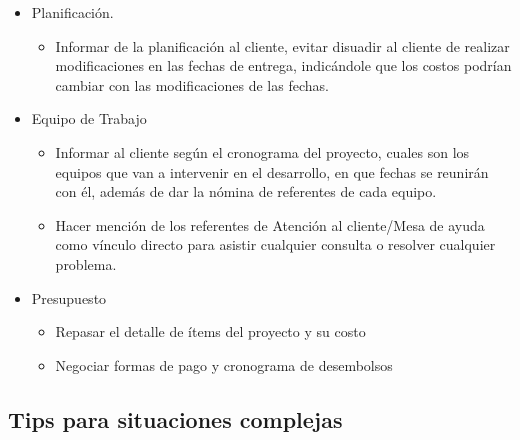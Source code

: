 \begin{itemize}
\begin{itemize}
		\item Planificación.
        
		\begin{itemize}
			\item Informar de la planificación al cliente, evitar disuadir al cliente de realizar modificaciones en las fechas de entrega, indicándole que los costos podrían cambiar con las modificaciones de las fechas.
	    \end{itemize}
        
		\item Equipo de Trabajo
        
    	\begin{itemize}
			\item Informar al cliente según el cronograma del proyecto, cuales son los equipos que van a intervenir en el desarrollo, en que fechas se reunirán con él, además de dar la nómina de referentes de cada equipo.
			\item Hacer mención de los referentes de Atención al cliente/Mesa de ayuda como vínculo directo para asistir cualquier consulta o resolver cualquier problema.
		\end{itemize}
        
		\item Presupuesto
        
	    \begin{itemize}
			\item Repasar el detalle de ítems del proyecto y su costo
			\item Negociar formas de pago y cronograma de desembolsos
		\end{itemize}
	\end{itemize}
\end{itemize}


\subsection{Tips para situaciones complejas}

